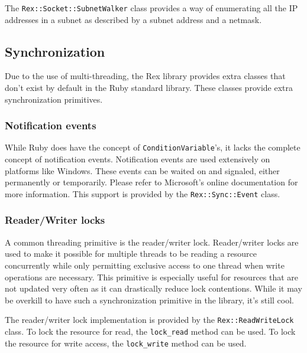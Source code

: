 \documentclass{report}
\begin{document}
\par
The \texttt{Rex::Socket::SubnetWalker} class provides a way of
enumerating all the IP addresses in a subnet as described by a
subnet address and a netmask.

        \subsection{Synchronization}

\par
Due to the use of multi-threading, the Rex library provides extra
classes that don't exist by default in the Ruby standard library.
These classes provide extra synchronization primitives.

            \subsubsection{Notification events}

\par
While Ruby does have the concept of \texttt{ConditionVariable}'s, it
lacks the complete concept of notification events.  Notification
events are used extensively on platforms like Windows.  These events
can be waited on and signaled, either permanently or temporarily.
Please refer to Microsoft's online documentation for more
information. This support is provided by the
\texttt{Rex::Sync::Event} class.

            \subsubsection{Reader/Writer locks}

\par
A common threading primitive is the reader/writer lock.
Reader/writer locks are used to make it possible for multiple
threads to be reading a resource concurrently while only permitting
exclusive access to one thread when write operations are necessary.
This primitive is especially useful for resources that are not
updated very often as it can drastically reduce lock contentions.
While it may be overkill to have such a synchronization primitive in
the library, it's still cool.

\par
The reader/writer lock implementation is provided by the
\texttt{Rex::ReadWriteLock} class.  To lock the resource for read,
the \texttt{lock\_read} method can be used.  To lock the resource
for write access, the \texttt{lock\_write} method can be used.
\end{document}
